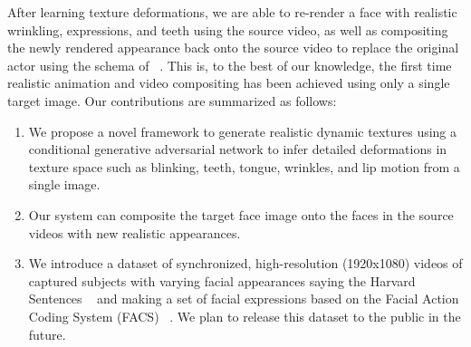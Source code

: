 After learning texture deformations, we are able to re-render a face with realistic wrinkling, expressions, and teeth using the source video, 
as well as compositing the newly rendered appearance back onto the source video to replace the original actor using the schema of ~\cite{replace}.  This is, to the best of our knowledge, the first time realistic animation and video compositing has been achieved using only a single target image. 
Our contributions are summarized as follows:


\begin{enumerate}
\item We propose a novel framework to generate realistic dynamic textures using a conditional generative adversarial network to infer detailed deformations in texture space such as blinking, teeth, tongue, wrinkles, and lip motion from a single image.
\item Our system can composite the target face image onto the faces in the source videos with new realistic appearances.
\item We introduce a dataset of synchronized, high-resolution (1920x1080) videos of captured subjects with varying facial appearances saying the Harvard Sentences ~\cite{HarvardSent:1969} and making a set of facial expressions based on the Facial Action Coding System (FACS) ~\cite{Ekman:1978}. We plan to release this dataset to the public in the future.
\end{enumerate}
